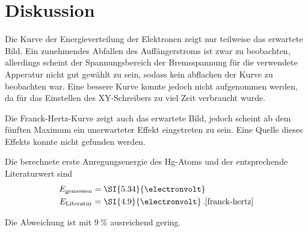 \section{Diskussion}
\label{sec:Diskussion}

Die Kurve der Energieverteilung der Elektronen zeigt nur teilweise das erwartete Bild.
Ein zunehmendes Abfallen des Auffängerstroms ist zwar zu beobachten, allerdings scheint der Spannungsbereich der Bremsspannung für die verwendete Apperatur nicht gut gewählt zu sein, sodass kein abflachen der Kurve zu beobachten war.
Eine bessere Kurve konnte jedoch nicht aufgenommen werden, da für das Einstellen des XY-Schreibers zu viel Zeit verbraucht wurde.

Die Franck-Hertz-Kurve zeigt auch das erwartete Bild, jedoch scheint ab dem fünften Maximum ein unerwarteter Effekt eingetreten zu sein.
Eine Quelle dieses Effekts konnte nicht gefunden werden.

Die berechnete erste Anregungsenergie des Hg-Atoms und der entsprechende Literaturwert sind
\begin{align*}
    E_\text{gemessen} &= \SI{5.34}{\electronvolt} \\
    E_\text{Literatur} &= \SI{4.9}{\electronvolt} \,.\text{\cite{franck-hertz}}
\end{align*}

Die Abweichung ist mit $\SI{9}{\percent}$ ausreichend gering.

